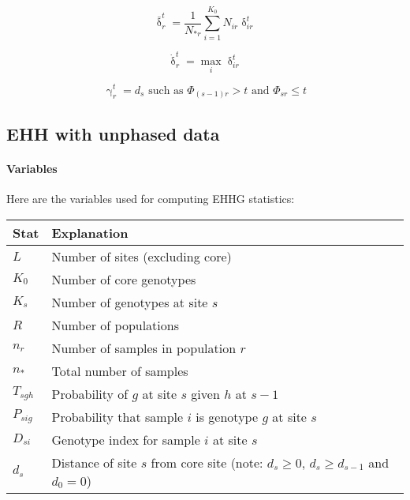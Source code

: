 \documentclass{scrartcl}
\begin{document}
\begin{displaymath}
    \bar{\updelta}^t_r = \frac{1}{N_{*r}} \sum_{i=1}^{K_0}N_{ir}\updelta^t_{ir}
\end{displaymath}

\begin{displaymath}
    \dot{\updelta}^t_r = \max_i{\updelta^t_{ir}}
\end{displaymath}

\begin{displaymath}
    \upgamma^t_r = d_s \text{ such as } \Phi_{(s-1)r} > t \text{ and } \Phi_{sr} \leq t
\end{displaymath}


\subsection{EHH with unphased data}

\paragraph{Variables}

Here are the variables used for computing EHHG statistics: \\

\begin{tabular}{ l l }                                                                                           \hline
    Stat       &  Explanation                                                                                 \\ \hline
    $L$        &  Number of sites (excluding core)                                                            \\
    $K_0$      &  Number of core genotypes                                                                    \\
    $K_s$      &  Number of genotypes at site $s$                                                             \\
    $R$        &  Number of populations                                                                       \\
    $n_r$      &  Number of samples in population $r$                                                         \\
    $n_*$      &  Total number of samples                                                                     \\
    $T_{sgh}$  &  Probability of $g$ at site $s$ given $h$ at $s-1$                                           \\
    $P_{sig}$  &  Probability that sample $i$ is genotype $g$ at site $s$                                     \\
    $D_{si}$   &  Genotype index for sample $i$ at site $s$                                                   \\
    $d_s$      &  Distance of site $s$ from core site (note: $d_s \geq 0$, $d_s \geq d_{s-1}$ and $d_0 = 0$)  \\ \hline
\end{tabular}
\\
\end{document}
